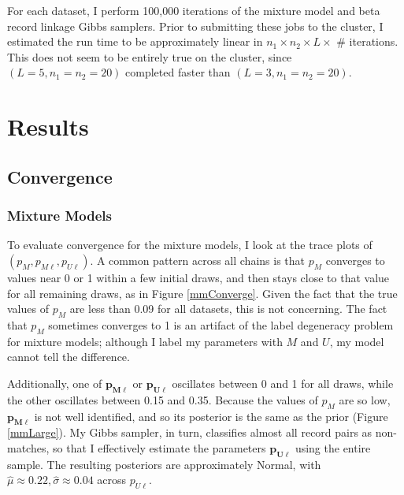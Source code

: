 \documentclass[11pt,reqno]{amsart}
\newcommand\params{(p_M, p_{M\ell}, p_{U\ell})}
\begin{document}
For each dataset, I perform 100,000 iterations of the mixture model and beta record linkage Gibbs samplers.  Prior to submitting these jobs to the cluster, I estimated the run time to be approximately linear in $n_1\times n_2 \times L \times $ \# iterations.  This does not seem to be entirely true on the cluster, since $(L=5, n_1 = n_2 = 20)$ completed faster than $(L=3,n_1=n_2=20)$. 

\section{Results}

\subsection{Convergence}
\subsubsection{Mixture Models} 
To evaluate convergence for the mixture models, I look at the trace plots of $\params$.  A common pattern across all chains is that $p_M$ converges to values near 0 or 1 within a few initial draws, and then stays close to that value for all remaining draws, as in Figure \ref{mmConverge}.  Given the fact that the true values of $p_M$ are less than 0.09 for all datasets, this is not concerning.  The fact that $p_M$ sometimes converges to 1 is an artifact of the label degeneracy problem for mixture models; although I label my parameters with $M$ and $U$, my model cannot tell the difference.

Additionally, one of $\mathbf{p_{M\ell}}$ or $\mathbf{p_{U\ell}}$ oscillates between 0 and 1 for all draws, while the other oscillates between 0.15 and 0.35.  Because the values of $p_M$ are so low, $\mathbf{p_{M\ell}}$ is not well identified, and so its posterior is the same as the prior (Figure \ref{mmLarge}).  My Gibbs sampler, in turn, classifies almost all record pairs as non-matches, so that I effectively estimate the parameters $\mathbf{p_{U\ell}}$ using the entire sample. The resulting posteriors are approximately Normal, with $\hat{\mu} \approx 0.22,  \hat{\sigma} \approx 0.04$ across $p_{U\ell}$.
 
\end{document}

